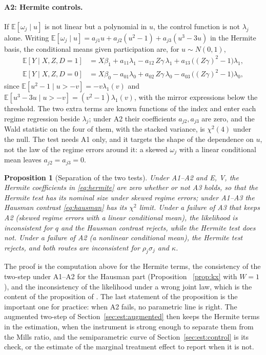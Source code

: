 \documentclass[11pt,a4paper]{article}
\theoremstyle{plain}
\newtheorem{proposition}{Proposition}
\theoremstyle{definition}
\theoremstyle{remark}
\newcommand{\E}{\mathbb{E}}
\newcommand{\1}{\mathbf{1}}
\begin{document}
\paragraph{A2: Hermite controls.}
If $\E[\omega_j\mid u]$ is not linear but a polynomial in $u$, the
control function is not $\lambda_j$ alone. Writing
$\E[\omega_j\mid u]=a_{j1}u+a_{j2}(u^2-1)+a_{j3}(u^3-3u)$ in the Hermite
basis, the conditional means given participation are, for $u\sim N(0,1)$,
\begin{equation}\label{eq:hermite}
\begin{aligned}
\E[Y\mid X,Z,D=1]&=X\beta_1+a_{11}\lambda_1-a_{12}\,Z\gamma\,\lambda_1+a_{13}\,\bigl((Z\gamma)^2-1\bigr)\lambda_1,\\
\E[Y\mid X,Z,D=0]&=X\beta_0-a_{01}\lambda_0+a_{02}\,Z\gamma\,\lambda_0-a_{03}\,\bigl((Z\gamma)^2-1\bigr)\lambda_0,
\end{aligned}
\end{equation}
since $\E[u^2-1\mid u>-v]=-v\lambda_1(v)$ and
$\E[u^3-3u\mid u>-v]=(v^2-1)\lambda_1(v)$, with the mirror expressions
below the threshold. The two extra terms are known functions of the index
and enter each regime regression beside $\lambda_j$; under A2 their
coefficients $a_{j2},a_{j3}$ are zero, and the Wald statistic on the four
of them, with the stacked variance, is $\chi^2(4)$ under the null. The
test needs A1 only, and it targets the shape of the dependence on $u$,
not the law of the regime errors around it: a skewed $\omega_j$ with a
linear conditional mean leaves $a_{j2}=a_{j3}=0$.

\begin{proposition}[Separation of the two tests]\label{prop:normal}
Under A1--A2 and E, V, the Hermite coefficients in \eqref{eq:hermite}
are zero whether or not A3 holds, so that the Hermite test has its
nominal size under skewed regime errors; under A1--A3 the Hausman contrast
\eqref{eq:hausman} has its $\chi^2$ limit. Under a failure of A3 that
keeps A2 (skewed regime errors with a linear conditional mean), the
likelihood is inconsistent for $q$ and the Hausman contrast rejects,
while the Hermite test does not. Under a failure of A2 (a nonlinear
conditional mean), the Hermite test rejects, and both routes are
inconsistent for $\rho_j\sigma_j$ and $\kappa$.
\end{proposition}

The proof is the computation above for the Hermite terms, the consistency
of the two-step under A1--A2 for the Hausman part (Proposition~%
\ref{prop:kx} with $W=1$), and the inconsistency of the likelihood under
a wrong joint law, which is the content of the proposition of
\citet{araar2026msat}. The last statement of the proposition is the
important one for practice: when A2 fails, no parametric line is right.
The augmented two-step of Section~\ref{sec:est:augmented} then keeps the
Hermite terms in the estimation, when the instrument is strong enough to
separate them from the Mills ratio, and the semiparametric curve of
Section~\ref{sec:est:control} is its check, or the estimate of the
marginal treatment effect to report when it is not.
\end{document}
